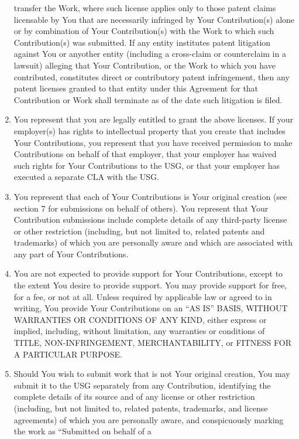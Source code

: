 \documentclass[8pt]{article}
\begin{document}
\begin{Form}
\begin{enumerate}
  transfer the Work, where such license applies only to those patent
  claims licensable by You that are necessarily infringed by Your
  Contribution(s) alone or by combination of Your Contribution(s) with
  the Work to which such Contribution(s) was submitted. If any entity
  institutes patent litigation against You or anyother entity (including
  a cross-claim or counterclaim in a lawsuit) alleging that Your
  Contribution, or the Work to which you have contributed, constitutes
  direct or contributory patent infringement, then any patent licenses
  granted to that entity under this Agreement for that Contribution or
  Work shall terminate as of the date such litigation is filed.
\item
  You represent that you are legally entitled to grant the above
  licenses. If your employer(s) has rights to intellectual property that
  you create that includes Your Contributions, you represent that you
  have received permission to make Contributions on behalf of that
  employer, that your employer has waived such rights for Your
  Contributions to the USG, or that your employer has executed a
  separate CLA with the USG.
\item
  You represent that each of Your Contributions is Your original
  creation (see section 7 for submissions on behalf of others). You
  represent that Your Contribution submissions include complete details
  of any third-party license or other restriction (including, but not
  limited to, related patents and trademarks) of which you are
  personally aware and which are associated with any part of Your
  Contributions.
\item
  You are not expected to provide support for Your Contributions, except
  to the extent You desire to provide support. You may provide support
  for free, for a fee, or not at all. Unless required by applicable law
  or agreed to in writing, You provide Your Contributions on an ``AS
  IS'' BASIS, WITHOUT WARRANTIES OR CONDITIONS OF ANY KIND, either
  express or implied, including, without limitation, any warranties or
  conditions of TITLE, NON-INFRINGEMENT, MERCHANTABILITY, or FITNESS FOR
  A PARTICULAR PURPOSE.
\item
  Should You wish to submit work that is not Your original creation, You
  may submit it to the USG separately from any Contribution, identifying
  the complete details of its source and of any license or other
  restriction (including, but not limited to, related patents,
  trademarks, and license agreements) of which you are personally aware,
  and conspicuously marking the work as ``Submitted on behalf of a

\end{enumerate}
\end{Form}
\end{document}
